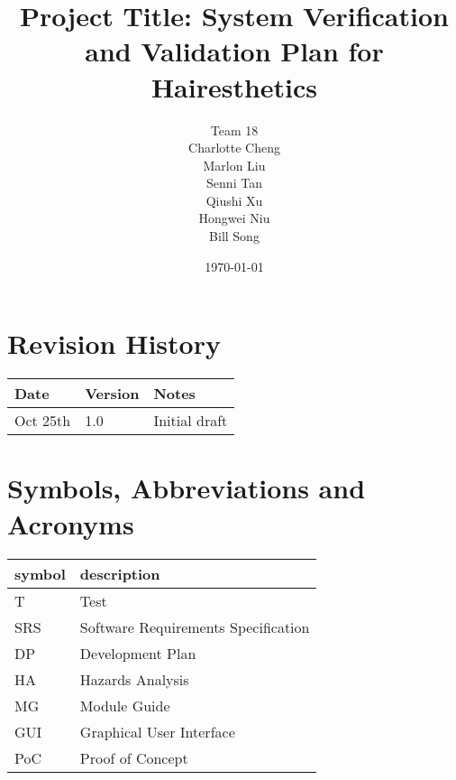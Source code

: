 \documentclass[12pt, titlepage]{article}
\begin{document}
\title{Project Title: System Verification and Validation Plan for Hairesthetics} 
\author{Team 18 \\ Charlotte Cheng
        \\ Marlon Liu
        \\ Senni Tan
        \\ Qiushi Xu
        \\ Hongwei Niu
        \\ Bill Song
}
\date{\today}
	
\maketitle


\section{Revision History}

\begin{tabularx}{\textwidth}{p{3cm}p{2cm}X}
\toprule {\bf Date} & {\bf Version} & {\bf Notes}\\
\midrule
Oct 25th & 1.0 & Initial draft\\
\bottomrule
\end{tabularx}

\newpage

\tableofcontents

\listoftables

\newpage

\section{Symbols, Abbreviations and Acronyms}

\renewcommand{\arraystretch}{1.2}
\begin{tabular}{l l} 
  \toprule		
  \textbf{symbol} & \textbf{description}\\
  \midrule 
  T & Test\\
  SRS & Software Requirements Specification\\
  DP & Development Plan\\
  HA & Hazards Analysis\\
  MG & Module Guide\\
  GUI & Graphical User Interface\\
  PoC & Proof of Concept\\
  
  \bottomrule
\end{tabular}\\
\end{document}
